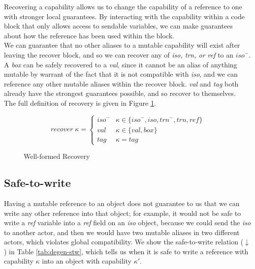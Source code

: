 Recovering a capability allows us to change the capability of a reference to one with stronger local guarantees. By interacting with the capability within a code block that only allows access to sendable variables, we can make guarantees about how the reference has been used within the block. \\

We can guarantee that no other aliases to a mutable capability will exist after leaving the recover block, and so we can recover any of \textit{iso, trn, or ref} to an $\textit{iso}^-$. A \textit{box} can be safely recovered to a \textit{val}, since it cannot be an alias of anything mutable by warrant of the fact that it is not compatible with \textit{iso}, and we can reference any other mutable aliases within the recover block. \textit{val} and \textit{tag} both already have the strongest guarantees possible, and so recover to themselves. \\

The full definition of recovery is given in Figure \ref{fig:degen-recover}.

\begin{figure}[H]
    \centering
    \[ recover \; \kappa = \begin{cases}
        \textit{iso}^- & \kappa \in \{ \textit{iso}^-, \textit{iso}, \textit{trn}^-, \textit{trn}, \textit{ref} \} \\
        \textit{val} & \kappa \in \{ \textit{val}, \textit{box} \} \\
        \textit{tag} & \kappa = \textit{tag}
    \end{cases}
    \]
    \caption{Well-formed Recovery}
    \label{fig:degen-recover}
\end{figure}

\subsection{Safe-to-write}

Having a mutable reference to an object does not guarantee to us that we can write any other reference into that object; for example, it would not be safe to write a \textit{ref} variable into a \textit{ref} field on an \textit{iso} object, because we could send the \textit{iso} to another actor, and then we would have two mutable aliases in two different actors, which violates global compatibility. We show the safe-to-write relation ($\downarrow$) in Table \ref{tab:degen-stw}, which tells us when it is safe to write a reference with capability $\kappa$ into an object with capability $\kappa'$.

